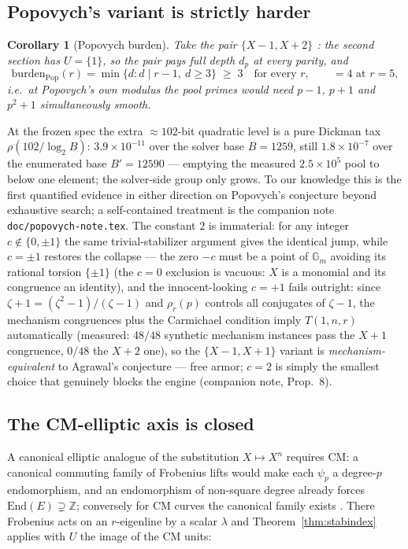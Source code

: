\documentclass[11pt]{article}
\newtheorem{corollary}[theorem]{Corollary}
\theoremstyle{remark}
\newcommand{\Z}{\mathbb{Z}}
\begin{document}
\subsection{Popovych's variant is strictly harder}

\begin{corollary}[Popovych burden]\label{cor:pop}
Take the pair $\{X - 1, X + 2\}$ \cite{Popovych09}: the second section has
$U = \{1\}$, so the pair pays full depth $d_p$ at every parity, and
\[
\mathrm{burden}_{\mathrm{Pop}}(r) = \min\{d : d \mid r - 1,\ d \ge 3\}
\;\ge\; 3 \quad \text{for every } r, \qquad = 4 \text{ at } r = 5,
\]
i.e.\ at Popovych's own modulus the pool primes would need $p - 1$,
$p + 1$ \emph{and} $p^2 + 1$ simultaneously smooth.
\end{corollary}

At the frozen spec the extra ${\approx}102$-bit quadratic level is a pure
Dickman tax $\rho(102/\log_2 B)$: $3.9\times10^{-11}$ over the solver base
$B = 1259$, still $1.8\times10^{-7}$ over the enumerated base
$B' = 12590$ --- emptying the measured $2.5\times10^5$ pool to below one
element; the solver-side group only grows. To our knowledge this is the
first quantified evidence in either direction on Popovych's conjecture
beyond exhaustive search; a self-contained treatment is the companion
note \texttt{doc/popovych-note.tex}. The constant $2$ is immaterial: for
any integer $c \notin \{0, \pm 1\}$ the same trivial-stabilizer argument
gives the identical jump, while $c = \pm 1$ restores the collapse --- the
zero $-c$ must be a point of $\mathbb G_m$ avoiding its rational torsion
$\{\pm 1\}$ (the $c = 0$ exclusion is vacuous: $X$ is a monomial and its
congruence an identity), and the innocent-looking $c = +1$ fails
outright: since
$\zeta + 1 = (\zeta^2 - 1)/(\zeta - 1)$ and $\rho_r(p)$ controls all
conjugates of $\zeta - 1$, the mechanism congruences plus the Carmichael
condition imply $T(1, n, r)$ automatically (measured: $48/48$ synthetic
mechanism instances pass the $X+1$ congruence, $0/48$ the $X+2$ one), so
the $\{X-1, X+1\}$ variant is \emph{mechanism-equivalent} to Agrawal's
conjecture --- free armor; $c = 2$ is simply the smallest choice that
genuinely blocks the engine (companion note, Prop.~8).

\subsection{The CM-elliptic axis is closed}

A canonical elliptic analogue of the substitution $X \mapsto X^n$ requires
CM: a canonical commuting family of Frobenius lifts would make each
$\psi_p$ a degree-$p$ endomorphism, and an endomorphism of non-square
degree already forces $\mathrm{End}(E) \supsetneq \Z$; conversely for CM
curves the canonical family exists \cite{BorgerGurney}. There Frobenius
acts on an $r$-eigenline by a scalar $\lambda$ and
Theorem~\ref{thm:stabindex} applies with $U$ the image of the CM units:
\end{document}

